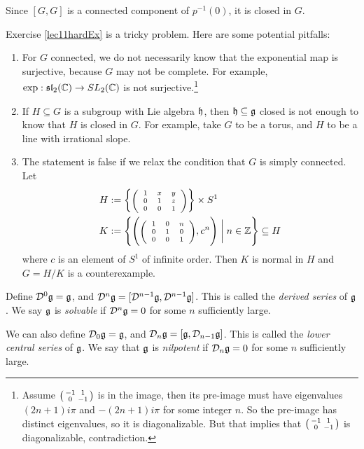 \begin{exercise}
\begin{solution}
   Since $[G,G]$ is a connected component of $p^{-1}(0)$, it is closed in $G$.
  \end{solution}
 \end{exercise}

   \begin{warning} Exercise \ref{lec11hardEx} is a tricky problem. Here are some
   potential pitfalls:
     \begin{enumerate}
       \item For $G$ connected, we do not necessarily know that the exponential map is
       surjective, because $G$ may not be complete. For example, $\exp: \mathfrak{sl}_2(\mathbb{C})\to
       SL_2(\mathbb{C})$ is not surjective.\footnote{Assume $\left( \begin{smallmatrix} -1 & 1 \\ 0 & -1 \end{smallmatrix} \right)$ is in the
       image, then its pre-image must have eigenvalues $(2n+1)i\pi$ and $-(2n+1)i\pi$
       for some integer $n$. So the pre-image has distinct eigenvalues, so it is
       diagonalizable. But that implies that $\left( \begin{smallmatrix} -1 & 1 \\ 0 & -1 \end{smallmatrix} \right)$ is diagonalizable,
       contradiction.}

       \item If $H\subseteq G$ is a subgroup with Lie algebra $\mathfrak{h}$, then $\mathfrak{h}\subseteq
       \mathfrak{g}$ closed is not enough to know that $H$ is closed in $G$. For example, take
       $G$ to be a torus, and $H$ to be a line with irrational slope.

       \item The statement is false if we relax the condition that $G$ is simply
       connected. Let
       \begin{align*}
          H &:= \left\{ \mbox{\scriptsize $\left( \begin{array}{cccccccccccccccccccccccccccc} 1 & x & y\\0 & 1 & z\\0 & 0 &1 \end{array}\right)$}\right\}\times S^1\\
          K &:= \left\{ \Biggl(
            \mbox{\scriptsize $\left( \begin{array}{cccccccccccccccccccccccccccc} 
              1 & 0 & n\\
              0 & 1 & 0\\
              0 & 0 & 1 \end{array}\right)$},c^n\Biggr)
          \biggm|n\in \mathbb{Z} \right\}
          \subseteq H
       \end{align*}
       where $c$ is an element of $S^1$ of infinite order. Then $K$ is normal in $H$
       and $G=H/K$ is a counterexample.
     \end{enumerate}
   \end{warning}


 \begin{definition}
   Define $\mathcal{D}^0\mathfrak{g}=\mathfrak{g}$, and $\mathcal{D}^n\mathfrak{g} = [\mathcal{D}^{n-1}\mathfrak{g},\mathcal{D}^{n-1}\mathfrak{g}]$. This is called the
   \emph{derived series} of $\mathfrak{g}$. We say $\mathfrak{g}$ is
   \emph{solvable} if $\mathcal{D}^n\mathfrak{g}=0$ for some $n$ sufficiently large.
 \end{definition}
 \begin{definition}
   We can also define $\mathcal{D}_0\mathfrak{g}=\mathfrak{g}$, and $\mathcal{D}_n\mathfrak{g} = [\mathfrak{g},\mathcal{D}_{n-1}\mathfrak{g}]$. This is called the
   \emph{lower central series} of $\mathfrak{g}$. We say that $\mathfrak{g}$
   is \emph{nilpotent} if $\mathcal{D}_n\mathfrak{g}=0$ for some $n$ sufficiently large.
 \end{definition}

